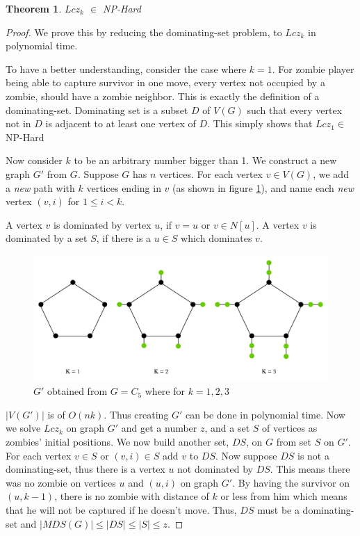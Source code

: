 \documentclass[1p]{elsarticle}
\newtheorem{theorem}{Theorem}
\begin{document}
	\begin{theorem}
		$Lcz_k$ $\in$ NP-Hard
	\end{theorem}
	\begin{proof}
		We prove this by reducing the dominating-set problem, to $Lcz_k$ in polynomial time.

		To have a better understanding, consider the case where $k=1$. For zombie player being able to capture survivor in
		one move, every vertex not occupied by a zombie, should have a zombie neighbor. This is exactly the definition
		of a dominating-set. Dominating set is a subset $D$ of $V(G)$ such that every vertex not in $D$ is adjacent to
		at least one vertex of $D$. This simply shows that $Lcz_1 \in$ NP-Hard 

		Now consider $k$ to be an arbitrary number bigger than 1. We construct a new graph $G'$ from $G$. Suppose $G$
		has $n$ vertices. For each vertex $v \in V(G)$, we add a {\it new} path with $k$ vertices ending in $v$ (as
		shown in figure \ref{fig:p7}), and name each {\it new} vertex $(v,i)$ for $1 \leq i < k$. 
		
		A vertex $v$ is dominated by vertex $u$, if $v = u$ or $v \in N[u]$. A vertex $v$ is dominated by a set $S$, if
		there is a $u \in S$ which dominates $v$.
		
		\begin{figure}[h!]
			\centering
			\includegraphics[width=0.9\linewidth]{fig/LCZ.png}
			\caption{$G'$ obtained from $G = C_5$ where for $k = 1,2,3$}
			\label{fig:p7}
		\end{figure}		


		$|V(G')|$ is of $O(nk)$. Thus creating $G'$ can be done in polynomial time. Now we solve $Lcz_k$ on graph $G'$
		and get a number $z$, and a set $S$ of vertices as zombies' initial positions. We now build another set,
		$DS$, on $G$ from set $S$ on $G'$. For each vertex $v \in S$ or $(v,i) \in S$ add $v$ to $DS$. Now suppose $DS$
		is not a dominating-set, thus there is a vertex $u$ not dominated by $DS$. This means there was no zombie on
		vertices $u$ and $(u,i)$ on graph $G'$. By having the survivor on $(u,k-1)$, there is no zombie with distance of
		$k$ or less from him which means that he will not be captured if he doesn't move. Thus, $DS$ must be a
		dominating-set and $ |MDS(G)| \leq |DS| \leq |S| \leq z$.


\end{proof}
\end{document}
